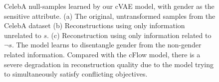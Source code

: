 \begin{figure}[tb]
{    CelebA null-samples learned by our cVAE model, with gender as the sensitive attribute.
    (a) The original, untransformed samples from the CelebA dataset
    (b) Reconstructions using only information unrelated to $s$.
    (c) Reconstruction using only information related to $\neg s$.
    The model learns to disentangle gender from the non-gender related information. Compared with the cFlow model, there is a severe degradation in reconstruction quality due to the model trying to simultaneously satisfy conflicting objectives.
  }\label{fig:celeba_vae}
\end{figure}

